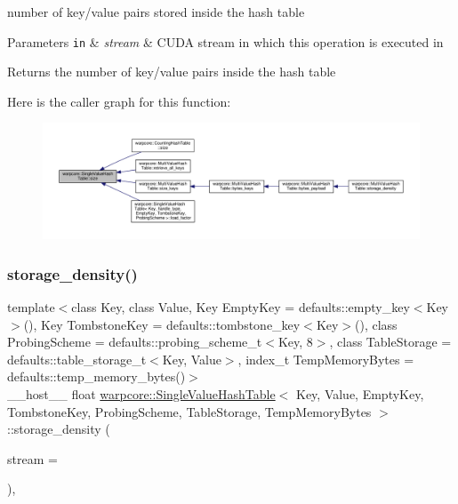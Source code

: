 number of key/value pairs stored inside the hash table 


\begin{DoxyParams}[1]{Parameters}
\mbox{\tt in}  & {\em stream} & C\+U\+DA stream in which this operation is executed in \\
\hline
\end{DoxyParams}
\begin{DoxyReturn}{Returns}
the number of key/value pairs inside the hash table 
\end{DoxyReturn}
Here is the caller graph for this function\+:
\nopagebreak
\begin{figure}[H]
\begin{center}
\leavevmode
\includegraphics[width=350pt]{classwarpcore_1_1SingleValueHashTable_a8f4dee48ff8aa87890b767d79b1eb835_icgraph}
\end{center}
\end{figure}
\mbox{\label{classwarpcore_1_1SingleValueHashTable_a9383092375777d800f145b7f2369832d}} 
\subsubsection{\texorpdfstring{storage\+\_\+density()}{storage\_density()}}
{\footnotesize\ttfamily template$<$class Key, class Value, Key Empty\+Key = defaults\+::empty\+\_\+key$<$\+Key$>$(), Key Tombstone\+Key = defaults\+::tombstone\+\_\+key$<$\+Key$>$(), class Probing\+Scheme = defaults\+::probing\+\_\+scheme\+\_\+t$<$\+Key, 8$>$, class Table\+Storage = defaults\+::table\+\_\+storage\+\_\+t$<$\+Key, Value$>$, index\+\_\+t Temp\+Memory\+Bytes = defaults\+::temp\+\_\+memory\+\_\+bytes()$>$ \\
\+\_\+\+\_\+host\+\_\+\+\_\+ float \hyperlink{classwarpcore_1_1SingleValueHashTable}{warpcore\+::\+Single\+Value\+Hash\+Table}$<$ Key, Value, Empty\+Key, Tombstone\+Key, Probing\+Scheme, Table\+Storage, Temp\+Memory\+Bytes $>$\+::storage\+\_\+density (\begin{DoxyParamCaption}\item[{cuda\+Stream\+\_\+t}]{stream = {} }\end{DoxyParamCaption})\hspace{0.3cm}{\ttfamily [inline]}, {\ttfamily [noexcept]}}



